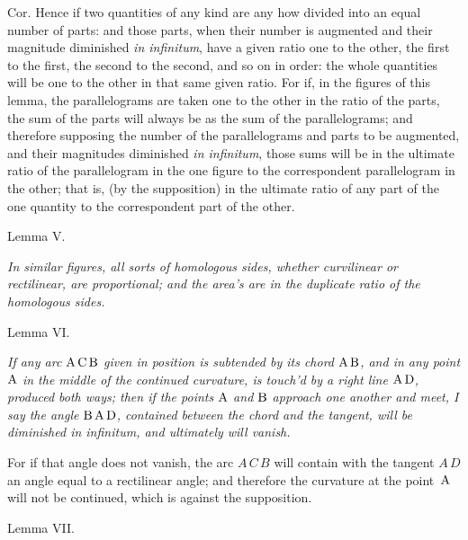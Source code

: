 {\sc Cor.}
Hence if two quantities of any kind are any how divided into an
equal number of parts: and those parts, when their number is
augmented and their magnitude diminished {\it in infinitum}, have
a given ratio one to the other, the first to the first, the
second to the second, and so on in order: the whole quantities
will be one to the other in that same given ratio.  For if, in
the figures of this lemma, the parallelograms are taken one to
the other in the ratio of the parts, the sum of the parts will
always be as the sum of the parallelograms; and therefore
supposing the number of the parallelograms and parts to be
augmented, and their magnitudes diminished {\it in infinitum},
those sums will be in the ultimate ratio of the parallelogram in
the one figure to the correspondent parallelogram in the other;
that is, (by the supposition) in the ultimate ratio of any part
of the one quantity to the correspondent part of the other.

\bigbreak

\centerline{\largesc Lemma V.}

\nobreak\bigskip

{\it
In similar figures, all sorts of homologous sides, whether
curvilinear or rectilinear, are proportional; and the area's are
in the duplicate ratio of the homologous sides.}

\bigbreak

\centerline{\largesc Lemma VI.}

\nobreak\bigskip

{\it
If any arc ${\rm A} \, {\rm C} \, {\rm B}$ given in position is
subtended by its chord ${\rm A} \, {\rm B}$, and in any point
${\rm A}$ in the middle of the continued curvature, is touch'd by
a right line ${\rm A} \, {\rm D}$, produced both ways; then if
the points ${\rm A}$ and ${\rm B}$ approach one another and meet,
I say the angle ${\rm B} \, {\rm A} \, {\rm D}$, contained
between the chord and the tangent, will be diminished
{\it in infinitum}, and ultimately will vanish.}

\midinsert
\centerline{}
\endinsert

\bigbreak

For if that angle does not vanish, the arc $A \, C \, B$ will
contain with the tangent $A \, D$ an angle equal to a rectilinear
angle; and therefore the curvature at the point~${\rm A}$ will
not be continued, which is against the supposition.

\bigbreak

\centerline{\largesc Lemma VII.}

